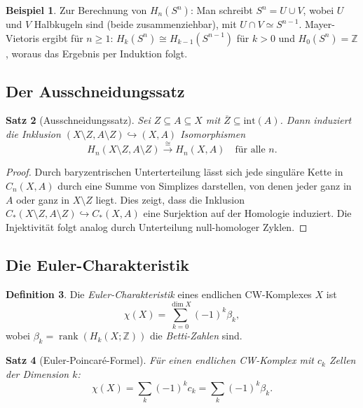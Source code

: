 \documentclass[12pt,a4paper]{amsart}
\newtheorem{theorem}{Satz}[section]
\theoremstyle{definition}
\newtheorem{definition}[theorem]{Definition}
\newtheorem{example}[theorem]{Beispiel}
\begin{document}
\begin{example}
Zur Berechnung von $H_n(S^n)$: Man schreibt $S^n = U \cup V$, wobei
$U$ und $V$ Halbkugeln sind (beide zusammenziehbar), mit $U \cap V \simeq S^{n-1}$.
Mayer-Vietoris ergibt f\"ur $n \geq 1$:
$H_k(S^n) \cong H_{k-1}(S^{n-1})$ f\"ur $k > 0$ und $H_0(S^n) = \mathbb{Z}$,
woraus das Ergebnis per Induktion folgt.
\end{example}

\subsection{Der Ausschneidungssatz}

\begin{theorem}[Ausschneidungssatz]
\label{thm:ausschneidung}
Sei $Z \subseteq A \subseteq X$ mit $\overline{Z} \subseteq \mathrm{int}(A)$.
Dann induziert die Inklusion $(X \setminus Z, A \setminus Z) \hookrightarrow (X, A)$
Isomorphismen
\[
  H_n(X \setminus Z, A \setminus Z) \xrightarrow{\cong} H_n(X, A)
  \quad \text{f\"ur alle } n.
\]
\end{theorem}
\begin{proof}
Durch baryzentrischen Unterterteilung l\"asst sich jede singul\"are Kette in
$C_n(X, A)$ durch eine Summe von Simplizes darstellen, von denen jeder ganz
in $A$ oder ganz in $X \setminus Z$ liegt. Dies zeigt, dass die Inklusion
$C_*(X \setminus Z, A \setminus Z) \hookrightarrow C_*(X, A)$ eine Surjektion
auf der Homologie induziert. Die Injektivit\"at folgt analog durch Unterteilung
null-homologer Zyklen.
\end{proof}

\subsection{Die Euler-Charakteristik}

\begin{definition}
Die \emph{Euler-Charakteristik} eines endlichen CW-Komplexes $X$ ist
\[
  \chi(X) = \sum_{k=0}^{\dim X} (-1)^k \beta_k,
\]
wobei $\beta_k = \operatorname{rank}(H_k(X;\mathbb{Z}))$ die
\emph{Betti-Zahlen} sind.
\end{definition}

\begin{theorem}[Euler-Poincar\'e-Formel]
F\"ur einen endlichen CW-Komplex mit $c_k$ Zellen der Dimension $k$:
\[
  \chi(X) = \sum_k (-1)^k c_k = \sum_k (-1)^k \beta_k.
\]
\end{theorem}
\end{document}

